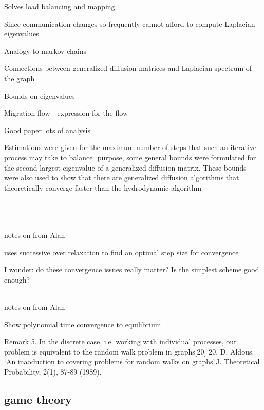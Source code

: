 \documentclass{article}
\begin{document}
Solves load balancing and mapping

Since communication changes so frequently cannot afford to compute Laplacian eigenvalues

Analogy to markov chains

Connections between generalized diffusion matrices and Laplacian spectrum of the graph

Bounds on eigenvalues

Migration flow - expression for the flow

Good paper lots of analysis


Estimations were given for the maximum number of steps that such an iterative process may take to balance
 purpose, some general bounds were formulated for the second largest eigenvalue of a generalized diffusion matrix. These bounds were also used to show that there are generalized diffusion algorithms that theoretically converge faster than the hydrodynamic algorithm 


\cite{ParabolicLB}\\
\cite{CYBENKO1989279}\\
\cite{10.2307/2584287}\\

notes on
\cite{10.2307/2584287}
from Alan

uses successive over relaxation to find an optimal step size for convergence

I wonder: do these convergence issues really matter?  Is the simplest scheme good enough?





\cite{Boillat:1990:LBP:95324.95326}\\

notes on
\cite{Boillat:1990:LBP:95324.95326}
from Alan

Show polynomial time convergence to equilibrium

Remark 5. In the discrete case, i.e. working with individual processes, our problem is equivalent to the random walk problem in graphs[20] 
20. D. Aldous. ‘An inaoduction to covering problems for random walks on graphs’.J. Theoretical 
Probability, 2(1), 87-89 (1989).


\cite{XU199572}











\subsection{game theory}
\end{document}
